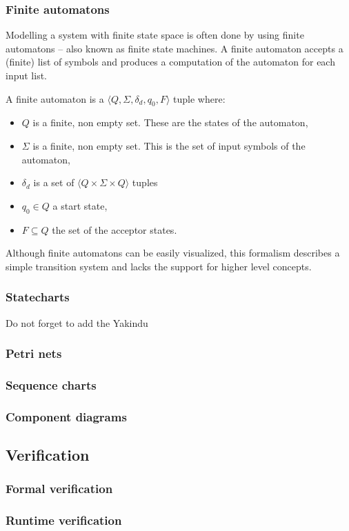     \subsubsection{Finite automatons}
Modelling a system with finite state space is often done by using finite automatons -- also known as finite state machines. A finite automaton accepts a (finite) list of symbols and produces a computation of the automaton for each input list.
      \begin{dfn}
        \label{dfn:fa}
A finite automaton is a $\langle Q,\Sigma,\delta_d,q_0, F \rangle$ tuple where:
        \begin{itemize}
          \item $Q$ is a finite, non empty set. These are the states of the automaton,
          \item $\Sigma$ is a finite, non empty set. This is the set of input symbols of the automaton,
          \item $\delta_d$ is a set of $\langle Q \times \Sigma \times Q \rangle$ tuples
          \item $q_0 \in Q$ a start state,
          \item $F \subseteq Q$ the set of the acceptor states.
        \end{itemize}
      \end{dfn}
Although finite automatons can be easily visualized, this formalism describes a simple transition system and lacks the support for higher level concepts.
    \subsubsection{Statecharts}
Do not forget to add the Yakindu
    \subsubsection{Petri nets}
    \subsubsection{Sequence charts}
    \subsubsection{Component diagrams}
  \subsection{Verification}
    \subsubsection{Formal verification}
    \subsubsection{Runtime verification}

%
